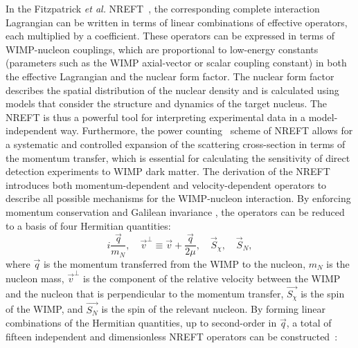 \documentclass[reprint, showpacs,
preprintnumbers,
amsmath,amssymb,
aps, floatfix,
superscriptaddress,
prd, nofootinbib]{revtex4-1}
\begin{document}
\par
In the Fitzpatrick \textit{et al.} NREFT~\cite{Fitzpatrick:EFT}, the corresponding complete interaction Lagrangian can be written in terms of linear combinations of effective operators, each multiplied by a coefficient. 
These operators can be expressed in terms of WIMP-nucleon couplings, which are proportional to low-energy constants (parameters such as the WIMP axial-vector or scalar coupling constant) in both the effective Lagrangian and the nuclear form factor. 
The nuclear form factor describes the spatial distribution of the nuclear density and is calculated using models that consider the structure and dynamics of the target nucleus.
The NREFT is thus a powerful tool for interpreting experimental data in a model-independent way. 
Furthermore, the power counting~\cite{BUCHALLA201480:EFT} scheme of NREFT allows for a systematic and controlled expansion of the scattering cross-section in terms of the momentum transfer, which is essential for calculating the sensitivity of direct detection experiments to WIMP dark matter.
The derivation of the NREFT introduces both momentum-dependent and velocity-dependent operators to describe all possible mechanisms for the WIMP-nucleon interaction. 
By enforcing momentum conservation and Galilean invariance \cite{Fitzpatrick:EFT}, the operators can be reduced to a basis of four Hermitian quantities:
\begin{equation}
i \frac{\vec{q}}{m_N}, \quad \vec{v}^\perp \equiv \vec{v} + \frac{\vec{q}}{2\mu}, \quad \vec{S}_{\chi}, \quad \vec{S}_{N},
\label{eq:basis}
\end{equation}
\noindent where $\vec{q}$ is the momentum transferred from the WIMP to the nucleon, $m_N$ is the nucleon mass, $\vec{v}^\perp$ is the component of the relative velocity between the WIMP and the nucleon that is perpendicular to the momentum transfer, $\vec{S_\chi}$ is the spin of the WIMP, and $\vec{S_N}$ is the spin of the relevant nucleon. 
By forming linear combinations of the Hermitian quantities, up to second-order in $\vec{q}$, a total of  fifteen independent and dimensionless NREFT operators can be constructed~\cite{Anand:MathematicaEFT}:
\end{document}
